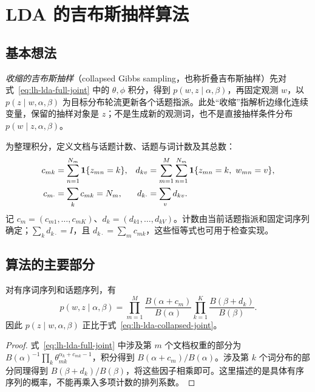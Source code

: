\section{LDA 的吉布斯抽样算法}
\label{sec:lh-lda-gibbs}

\subsection{基本想法}
\label{subsec:lh-lda-gibbs-idea}

\emph{收缩的吉布斯抽样}（collapsed Gibbs sampling，也称折叠吉布斯抽样）先对式~\eqref{eq:lh-lda-full-joint} 中的 $\theta,\phi$ 积分，得到 $p(w,z\mid\alpha,\beta)$，再固定观测 $w$，以 $p(z\mid w,\alpha,\beta)$ 为目标分布轮流更新各个话题指派。此处“收缩”指解析边缘化连续变量，保留的抽样对象是 $z$；不是生成新的观测词，也不是直接抽样条件分布 $p(w\mid z,\alpha,\beta)$。

为整理积分，定义文档与话题计数、话题与词计数及其总数：
\begin{align}
c_{mk}&=\sum_{n=1}^{N_m}\mathbf1\{z_{mn}=k\},&
d_{kv}&=\sum_{m=1}^M\sum_{n=1}^{N_m}\mathbf1\{z_{mn}=k,\ w_{mn}=v\},\notag\\
c_{m\cdot}&=\sum_kc_{mk}=N_m,&
d_{k\cdot}&=\sum_vd_{kv}.
\label{eq:lh-lda-counts}
\end{align}
记 $c_m=(c_{m1},\ldots,c_{mK})$、$d_k=(d_{k1},\ldots,d_{kV})$。计数由当前话题指派和固定词序列确定；$\sum_kd_{k\cdot}=I$，且 $d_{k\cdot}=\sum_mc_{mk}$，这些恒等式也可用于检查实现。

\subsection{算法的主要部分}
\label{subsec:lh-lda-gibbs-main}

\begin{proposition}[收缩联合分布]
\label{prop:lh-lda-collapsed-joint}
对有序词序列和话题序列，有
\begin{equation}
p(w,z\mid\alpha,\beta)
=\prod_{m=1}^M\frac{B(\alpha+c_m)}{B(\alpha)}
\prod_{k=1}^K\frac{B(\beta+d_k)}{B(\beta)}.
\label{eq:lh-lda-collapsed-joint}
\end{equation}
因此 $p(z\mid w,\alpha,\beta)$ 正比于式~\eqref{eq:lh-lda-collapsed-joint}。
\end{proposition}
\begin{proof}
式~\eqref{eq:lh-lda-full-joint} 中涉及第 $m$ 个文档权重的部分为 $B(\alpha)^{-1}\prod_k\theta_{mk}^{\alpha_k+c_{mk}-1}$，积分得到 $B(\alpha+c_m)/B(\alpha)$。涉及第 $k$ 个词分布的部分同理得到 $B(\beta+d_k)/B(\beta)$，将这些因子相乘即可。这里描述的是具体有序序列的概率，不能再乘入多项计数的排列系数。
\end{proof}

